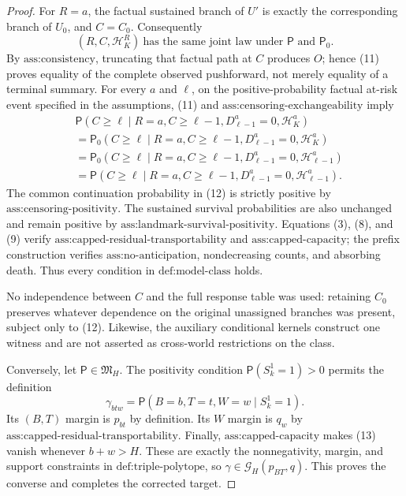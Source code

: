 \documentclass{article}
\begin{document}
\begin{proof}
For \(R=a\), the factual sustained branch of \(U'\) is exactly the corresponding branch of \(U_0\), and \(C=C_0\). Consequently
\[
 (R,C,\mathcal H_K^R)\ \text{has the same joint law under }
 \mathsf P\text{ and }\mathsf P_0.                       \tag{11}
\]
By \(\text{ass:consistency}\), truncating that factual path at \(C\) produces \(O\); hence (11) proves equality of the complete observed pushforward, not merely equality of a terminal summary. For every \(a\) and \(\ell\), on the positive-probability factual at-risk event specified in the assumptions, (11) and \(\text{ass:censoring-exchangeability}\) imply
\[
 \begin{aligned}
 &\mathsf P(C\ge\ell\mid R=a,C\ge\ell-1,D_{\ell-1}^a=0,
                         \mathcal H_K^a)\\
 &=\mathsf P_0(C\ge\ell\mid R=a,C\ge\ell-1,D_{\ell-1}^a=0,
                           \mathcal H_K^a)\\
 &=\mathsf P_0(C\ge\ell\mid R=a,C\ge\ell-1,D_{\ell-1}^a=0,
                           \mathcal H_{\ell-1}^a)\\
 &=\mathsf P(C\ge\ell\mid R=a,C\ge\ell-1,D_{\ell-1}^a=0,
                         \mathcal H_{\ell-1}^a).
 \end{aligned}                                           \tag{12}
\]
The common continuation probability in (12) is strictly positive by \(\text{ass:censoring-positivity}\). The sustained survival probabilities are also unchanged and remain positive by \(\text{ass:landmark-survival-positivity}\). Equations (3), (8), and (9) verify \(\text{ass:capped-residual-transportability}\) and \(\text{ass:capped-capacity}\); the prefix construction verifies \(\text{ass:no-anticipation}\), nondecreasing counts, and absorbing death. Thus every condition in \(\text{def:model-class}\) holds.

No independence between \(C\) and the full response table was used: retaining \(C_0\) preserves whatever dependence on the original unassigned branches was present, subject only to (12). Likewise, the auxiliary conditional kernels construct one witness and are not asserted as cross-world restrictions on the class.

Conversely, let \(\mathsf P\in\mathfrak M_H\). The positivity condition \(\mathsf P(S_k^1=1)>0\) permits the definition
\[
 \gamma_{btw}=\mathsf P(B=b,T=t,W=w\mid S_k^1=1).         \tag{13}
\]
Its \((B,T)\) margin is \(p_{bt}\) by definition. Its \(W\) margin is \(q_w\) by \(\text{ass:capped-residual-transportability}\). Finally, \(\text{ass:capped-capacity}\) makes (13) vanish whenever \(b+w>H\). These are exactly the nonnegativity, margin, and support constraints in \(\text{def:triple-polytope}\), so \(\gamma\in\mathcal G_H(p_{BT},q)\). This proves the converse and completes the corrected target.
\end{proof}
\end{document}
